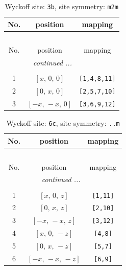 \documentclass[fleqn,8pt]{jsarticle}
\begin{document}
\begin{longtable}{ccc}
\caption{Wyckoff site: {\tt 3b}, site symmetry: {\tt m2m}}
 \\
 \hline \hline
No. & position & mapping \\ \hline \endfirsthead

\multicolumn{2}{l}{\tablename\ \thetable{}} \\
 \hline \hline
No. & position & mapping \\ \hline \endhead

 \hline \hline
\multicolumn{2}{r}{\footnotesize\it continued ...} \\ \endfoot

 \hline \hline
\multicolumn{2}{r}{} \\ \endlastfoot

1 & $\left[ x,\, 0,\, 0 \right]$ & {\tt [1,4,8,11]} \\ \hline
2 & $\left[ 0,\, x,\, 0 \right]$ & {\tt [2,5,7,10]} \\ \hline
3 & $\left[ - x,\, - x,\, 0 \right]$ & {\tt [3,6,9,12]} \\
\end{longtable}
\renewcommand{\arraystretch}{1.2}
\begin{longtable}{ccc}
\caption{Wyckoff site: {\tt 6c}, site symmetry: {\tt ..m}}
 \\
 \hline \hline
No. & position & mapping \\ \hline \endfirsthead

\multicolumn{2}{l}{\tablename\ \thetable{}} \\
 \hline \hline
No. & position & mapping \\ \hline \endhead

 \hline \hline
\multicolumn{2}{r}{\footnotesize\it continued ...} \\ \endfoot

 \hline \hline
\multicolumn{2}{r}{} \\ \endlastfoot

1 & $\left[ x,\, 0,\, z \right]$ & {\tt [1,11]} \\ \hline
2 & $\left[ 0,\, x,\, z \right]$ & {\tt [2,10]} \\ \hline
3 & $\left[ - x,\, - x,\, z \right]$ & {\tt [3,12]} \\ \hline
4 & $\left[ x,\, 0,\, - z \right]$ & {\tt [4,8]} \\ \hline
5 & $\left[ 0,\, x,\, - z \right]$ & {\tt [5,7]} \\ \hline
6 & $\left[ - x,\, - x,\, - z \right]$ & {\tt [6,9]} \\
\end{longtable}
\end{document}
